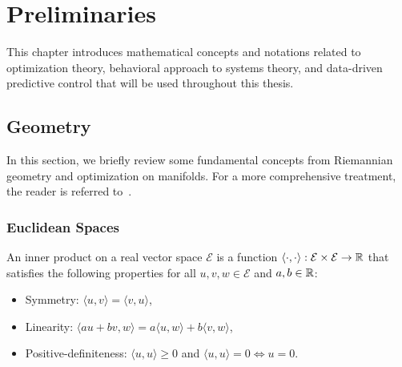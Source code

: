 \chapter{Preliminaries} \label{ch:Preliminaries}

This chapter introduces mathematical concepts and notations related to optimization theory, behavioral approach to systems theory, and data-driven predictive control that will be used throughout this thesis.

\section{Geometry} \label{sec:opt}

In this section, we briefly review some fundamental concepts from Riemannian geometry and optimization on manifolds. For a more comprehensive treatment, the reader is referred to~\cite{absil,boumal2023}.

\subsection{Euclidean Spaces}
\begin{definition}\label{def:euc-inner-prod}
    An inner product on a real vector space $\mathcal{E}$ is a function $\langle \cdot, \cdot \rangle : \mathcal{E} \times \mathcal{E} \to \mathbb{R}$ that satisfies the following properties for all $u,v,w \in \mathcal{E}$ and $a,b \in \mathbb{R}$:
    \begin{itemize}
        \item Symmetry: $\langle u, v \rangle = \langle v, u \rangle$,
        \item Linearity: $\langle au + bv, w \rangle = a\langle u, w \rangle + b\langle v, w \rangle$,
        \item Positive-definiteness: $\langle u, u \rangle \geq 0$ and $\langle u, u \rangle = 0 \iff u = 0$.
    \end{itemize}

\end{definition}

